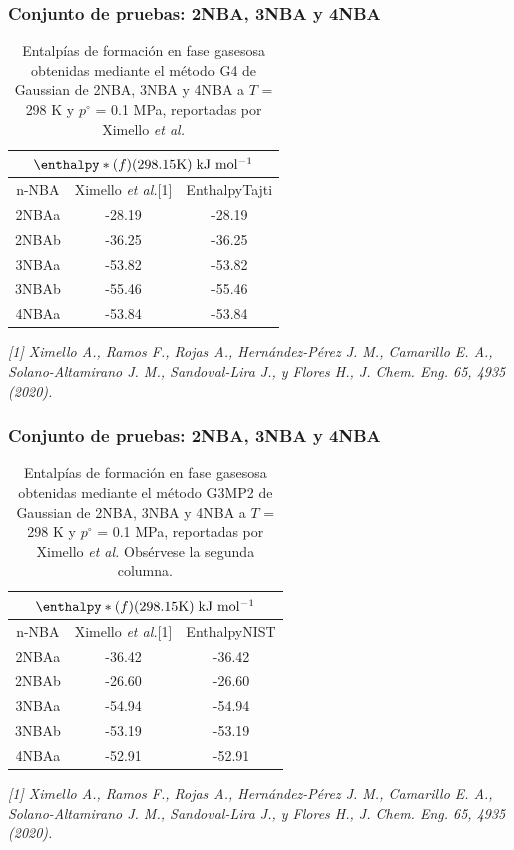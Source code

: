 \documentclass{beamer}
\begin{document}
\begin{frame}
\frametitle{Conjunto de pruebas: 2NBA, 3NBA y 4NBA}

\begin{table}[H]
\centering
\begin{tabular}{|c|c|c|}
\hline
	\multicolumn{3}{||c||}{$\enthalpy*(f){}(298.15 \mathrm{K})\; \mathrm{kJ\;mol^{-1}}$}\\
\hline
\hline
	n-NBA & Ximello \textit{et al.}[1] & EnthalpyTajti\\ 
\hline 
2NBAa & -28.19 & -28.19\\
\hline
2NBAb & -36.25 & -36.25\\ 
\hline 
3NBAa & -53.82 & -53.82\\
\hline
3NBAb & -55.46 & -55.46\\ 
\hline 
4NBAa & -53.84 & -53.84\\ 
\hline  
\end{tabular} 
	\caption{Entalpías de formación en fase gasesosa obtenidas mediante el método G4 de Gaussian de 2NBA, 3NBA y 4NBA a $T$ = 298 K y $p^{\circ}$ = 0.1 MPa, reportadas por Ximello \textit{et al.}}
\label{Ximello-table-1}
\end{table}
\textit{\tiny{[1] Ximello A., Ramos F., Rojas A., Hernández-Pérez J. M., Camarillo E. A., Solano-Altamirano J. M., Sandoval-Lira J., y Flores H., J. Chem. Eng. 65, 4935 (2020).}}
\end{frame}

\begin{frame}
\frametitle{Conjunto de pruebas: 2NBA, 3NBA y 4NBA}
\begin{table}[H]
\centering
\begin{tabular}{|c|c|c|}
\hline
	\multicolumn{3}{||c||}{$\enthalpy*(f){}(298.15 \mathrm{K})\; \mathrm{kJ\;mol^{-1}}$}\\
\hline
\hline
	n-NBA & Ximello \textit{et al.}[1] & EnthalpyNIST\\ 
\hline 
2NBAa & -36.42 & -36.42\\
\hline
2NBAb & -26.60 & -26.60\\ 
\hline 
3NBAa & -54.94 & -54.94\\
\hline
3NBAb & -53.19 & -53.19\\ 
\hline 
4NBAa & -52.91 & -52.91\\ 
\hline  
\end{tabular} 
	\caption{Entalpías de formación en fase gasesosa obtenidas mediante el método G3MP2 de Gaussian de 2NBA, 3NBA y 4NBA a $T$ = 298 K y $p^{\circ}$ = 0.1 MPa, reportadas por Ximello \textit{et al.} Obsérvese la segunda columna.}
\label{Ximello-table-2}
\end{table}
\textit{\tiny{[1] Ximello A., Ramos F., Rojas A., Hernández-Pérez J. M., Camarillo E. A., Solano-Altamirano J. M., Sandoval-Lira J., y Flores H., J. Chem. Eng. 65, 4935 (2020).}}
\end{frame}
\end{document}
